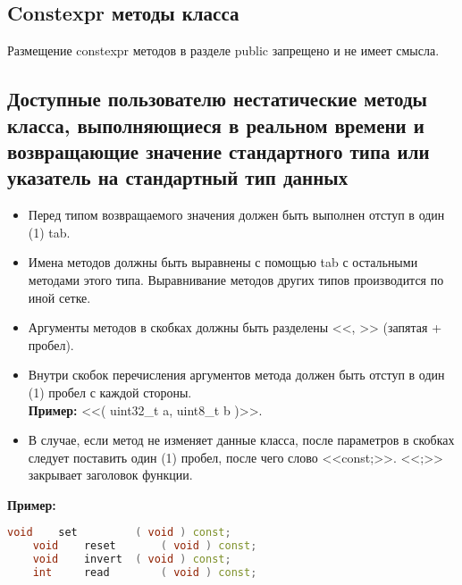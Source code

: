 \subsection{Constexpr методы класса}\label{constexpr:0}
Размещение constexpr методов в разделе public запрещено и не имеет смысла.

\subsection{Доступные пользователю нестатические методы класса, выполняющиеся в реальном времени и возвращающие значение стандартного типа или указатель на стандартный тип данных}\label{dp:n:s}
\begin{itemize}
	\item Перед типом возвращаемого значения должен быть выполнен отступ в один (1) tab.
	\item Имена методов должны быть выравнены с помощью tab с остальными методами этого типа. Выравнивание методов других типов производится по иной сетке.
	\item Аргументы методов в скобках должны быть разделены <<, >> (запятая + пробел).
	\item Внутри скобок перечисления аргументов метода должен быть отступ в один (1) пробел с каждой стороны.\\\textbf{Пример: } <<( uint32\_t a, uint8\_t b )>>.
	\item В случае, если метод не изменяет данные класса, после параметров в скобках следует поставить один (1) пробел, после чего слово <<const;>>. <<;>> закрывает заголовок функции.
\end{itemize}
\textbf{Пример:}\begin{lstlisting}[language=C++, frame=tlBR, basicstyle=\fontsize{10}{10}\ttfamily]
	void	set			( void ) const;
	void	reset		( void ) const;
	void	invert	( void ) const;
	int		read		( void ) const;
\end{lstlisting}

